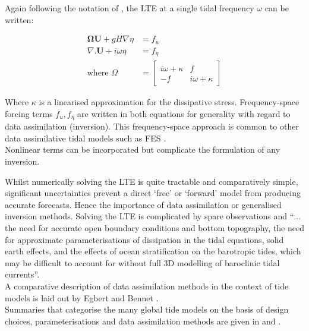 Again following the notation of \cite[pp186]{Egbert:2002ug}, the LTE at a single tidal frequency $\omega$ can be written:

\begin{align}
\label{E:LTE_momtm_w}
\mathbf{\Omega} \mathbf{U} + gH\nabla \eta &= f_u \\
\label{E:LTE_cont_w}
\nabla.\mathbf{U} + i\omega\eta &= f_\eta\\
\mbox{where   } \Omega             &=
\left[ \begin{array}{cc} 
      i\omega + \kappa & f \\ 
       -f              & i\omega + \kappa  
                        \end{array} \right]   \nonumber
\end{align}

Where $\kappa$ is a linearised approximation for the dissipative stress.   Frequency-space forcing terms $f_u, f_\eta$ are written in both equations for generality with regard to data assimilation (inversion).  This frequency-space approach is common to other data assimilative tidal models such as FES \cite[pp395]{Lyard:2006ir}.\\
Nonlinear terms can be incorporated but complicate the formulation of any inversion.



Whilst numerically solving the LTE is quite tractable and comparatively simple, significant uncertainties prevent a direct `free' or `forward' model from producing accurate forecasts.  Hence the importance of data assimilation or generalised inversion methods.  Solving the LTE is complicated by spare observations and ``$\dots$ the need for accurate open boundary conditions and bottom topography, the need for approximate parameterisations of dissipation in the tidal equations, solid earth effects, and the effects of ocean stratification on the barotropic tides, which may be difficult to account for without full 3D modelling of baroclinic tidal currents''\citep[183]{Egbert:2002ug}.\\
A comparative description of data assimilation methods in the context of tide models is laid out by Egbert and Bennet \cite{Egbert:1996vr}.\\   



Summaries that categorise the many global tide models on the basis of design choices, parameterisations and data assimilation methods are given in \cite{Ardalan:2008gs} and \cite{Matsumoto:2000tg}. \\

